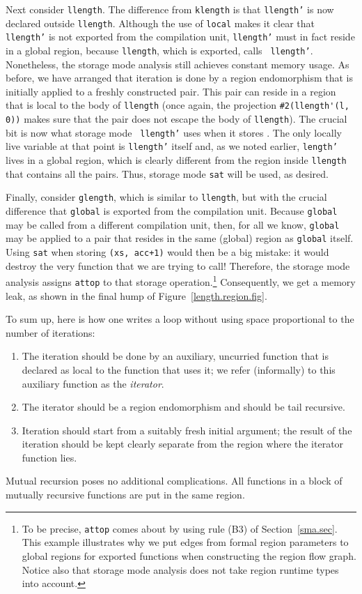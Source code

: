 \documentclass[12pt]{book}
\begin{document}
Next consider {\tt llength}. The difference from {\tt klength} is that
{\tt llength'} is now declared outside {\tt llength}.  Although the
use of {\tt local} makes it clear that {\tt llength'} is not exported
from the compilation unit, {\tt llength'} must in fact reside in a
global region, because {\tt llength}, which is exported, calls {\tt
  llength'}.  Nonetheless, the storage mode analysis still achieves
constant memory usage. As before, we have arranged that iteration is
done by a region endomorphism that is initially applied to a freshly
constructed pair. This pair can reside in a region that is local to
the body of {\tt llength} (once again, the projection
\verb+#2(llength'(l, 0))+ makes sure that the pair does not escape the
body of {\tt llength}).  The crucial bit is now what storage mode {\tt
  llength'} uses when it stores .  The only locally
live variable at that point is {\tt llength'} itself and, as we noted
earlier, {\tt length'} lives in a global region, which is clearly
different from the region inside {\tt llength} that contains all the
pairs.  Thus, storage mode {\tt sat} will be used, as desired.

Finally, consider {\tt glength}, which is similar to {\tt llength},
but with the crucial difference that {\tt global} is exported from the
compilation unit. Because {\tt global} may be called from a different
compilation unit, then, for all we know, {\tt global} may be applied
to a pair that resides in the same (global) region as {\tt global}
itself. Using {\tt sat} when storing {\tt (xs, acc+1)} would then be a
big mistake: it would destroy the very function that we are trying to
call! Therefore, the storage mode analysis assigns {\tt attop} to that
storage operation.\footnote{To be precise, {\tt attop} comes about by
  using rule (B3) of Section~\ref{sma.sec}. This example illustrates
  why we put edges from formal region parameters to global regions for
  exported functions when constructing the region flow graph. Notice
  also that storage mode analysis does not take region runtime types
  into account.}  Consequently, we get a memory leak, as shown in the
final hump of Figure~\ref{length.region.fig}.

To sum up, here is how one writes a loop without using space
proportional to the number of iterations:
%
\begin{enumerate}
\item The iteration should be done by an auxiliary, uncurried function
  that is declared as local to the function that uses it; we refer
  (informally) to this auxiliary function as the
  {\em iterator}.
\item The iterator should be a
  region endomorphism and should be tail recursive.
\item Iteration should start from a suitably fresh initial argument;
  the result of the iteration should be kept clearly separate from the
  region where the iterator function lies.
\end{enumerate}
Mutual recursion poses no additional complications. All functions in a
block of mutually recursive functions are put in the same region.
\end{document}
